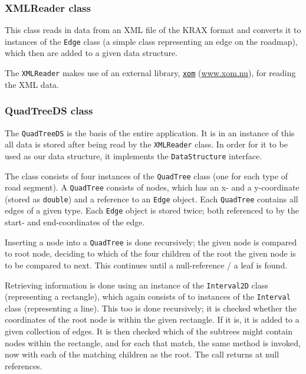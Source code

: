 \documentclass[a4paper,11pt]{article}
\begin{document}
\subsubsection{XMLReader class} %
This class reads in data from an XML file of the KRAX format and converts it to instances of the \texttt{Edge} class (a simple class representing an edge on the roadmap), which then are added to a given data structure.

The \texttt{XMLReader} makes use of an external library, \href{www.xom.nu}{\texttt{xom}} (\url{www.xom.nu}), for reading the XML data.

\subsubsection{QuadTreeDS class} %
The \texttt{QuadTreeDS} is the basis of the entire application. It is in an instance of this all data is stored after being read by the \texttt{XMLReader} class. In order for it to be used as our data structure, it implements the \texttt{DataStructure} interface.

The class consists of four instances of the \texttt{QuadTree} class (one for each type of road segment). A \texttt{QuadTree} consists of nodes, which has an x- and a y-coordinate (stored as \texttt{double}) and a reference to an \texttt{Edge} object. Each \texttt{QuadTree} contains all edges of a given type. Each \texttt{Edge} object is stored twice; both referenced to by the start- and end-coordinates of the edge.

Inserting a node into a \texttt{QuadTree} is done recursively; the given node is compared to root node, deciding to which of the four children of the root the given node is to be compared to next. This continues until a null-reference / a leaf is found.

Retrieving information is done using an instance of the \texttt{Interval2D} class (representing a rectangle), which again consists of to instances of the \texttt{Interval} class (representing a line). This too is done recursively; it is checked whether the coordinates of the root node is within the given rectangle. If it is, it is added to a given collection of edges. It is then checked which of the subtrees might contain nodes within the rectangle, and for each that match, the same method is invoked, now with each of the matching children as the root. The call returns at null references.
\end{document}
